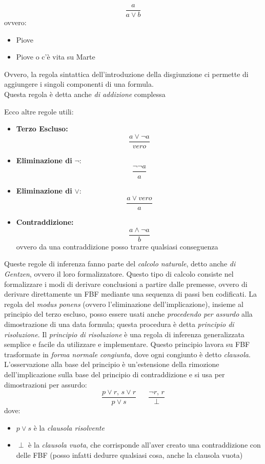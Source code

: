 \documentclass[a4paper,12pt, oneside]{book}
\begin{document}
\begin{esempio}
$$\frac{a}{a\vee b}$$
ovvero:
\begin{itemize}
\item Piove
\item Piove o c'è vita su Marte
\end{itemize}
Ovvero, la regola sintattica dell’introduzione della disgiunzione ci permette di aggiungere i singoli componenti di una formula.\\
Questa regola è detta anche \textit{di addizione}
complessa
\end{esempio}
\begin{esempio}
Ecco altre regole utili:
\begin{itemize}
\item \textbf{Terzo Escluso:}
$$\frac{a\vee\neg a}{vero}$$
\item \textbf{Eliminazione di} $\neg$:
$$\frac{\neg\neg a}{a}$$
\item \textbf{Eliminazione di} $\vee$:
$$\frac{a\vee vero}{a}$$
\item \textbf{Contraddizione:}
$$\frac{a\wedge\neg a}{b}$$
ovvero da una contraddizione posso trarre qualsiasi conseguenza
\end{itemize}
\end{esempio}
Queste regole di inferenza fanno parte del \textit{calcolo naturale}, detto anche \textit{di Gentzen}, ovvero il loro formalizzatore. Questo tipo di calcolo consiste nel formalizzare i modi di derivare conclusioni a partire dalle premesse, ovvero di derivare direttamente un FBF mediante una sequenza di passi ben codificati. La regola del \textit{modus ponens} (ovvero l'eliminazione dell'implicazione), insieme al principio del terzo escluso, posso essere usati anche \textit{procedendo per assurdo} alla dimostrazione di una data formula; questa procedura è detta \textit{principio di risoluzione}. Il \textit{principio di risoluzione} è una regola di inferenza generalizzata semplice e facile da utilizzare e implementare. Questo principio lavora su FBF trasformate in \textit{forma normale congiunta}, dove ogni congiunto è detto \textit{clausola}. L'osservazione alla base del principio è un'estensione della rimozione dell'implicazione sulla base del principio di contraddizione e si usa per dimostrazioni per assurdo:
$$\frac{p\vee r,\, s\vee r}{p\vee s}\,\,\,\,\,\,\,\,\,\,\frac{\neg r,\, r}{\perp}$$
dove:
\begin{itemize}
\item $p\vee s$ è la \textit{clausola risolvente}
\item $\perp$ è la \textit{clausola vuota}, che corrisponde all'aver creato una contraddizione con delle FBF (posso infatti dedurre qualsiasi cosa, anche la clausola vuota)
\end{itemize}
\end{document}
